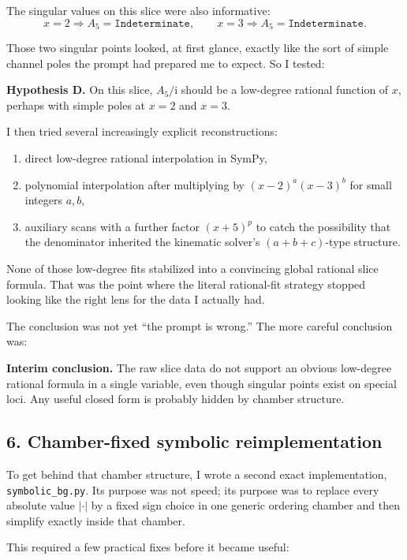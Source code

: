 \documentclass[11pt]{article}
\newcommand{\ii}{\mathrm{i}}
\begin{document}
The singular values on this slice were also informative:
\[
x=2 \Longrightarrow A_5=\texttt{Indeterminate},
\qquad
x=3 \Longrightarrow A_5=\texttt{Indeterminate}.
\]

Those two singular points looked, at first glance, exactly like the sort of
simple channel poles the prompt had prepared me to expect. So I tested:

\medskip
\textbf{Hypothesis D.} On this slice, $A_5/\ii$ should be a low-degree rational
function of $x$, perhaps with simple poles at $x=2$ and $x=3$.
\medskip

I then tried several increasingly explicit reconstructions:

\begin{enumerate}
\item direct low-degree rational interpolation in SymPy,
\item polynomial interpolation after multiplying by $(x-2)^a(x-3)^b$ for small
integers $a,b$,
\item auxiliary scans with a further factor $(x+5)^p$ to catch the possibility
that the denominator inherited the kinematic solver's $(a+b+c)$-type
structure.
\end{enumerate}

None of those low-degree fits stabilized into a convincing global rational
slice formula. That was the point where the literal rational-fit strategy
stopped looking like the right lens for the data I actually had.

The conclusion was not yet ``the prompt is wrong.'' The more careful
conclusion was:

\medskip
\textbf{Interim conclusion.} The raw slice data do not support an obvious
low-degree rational formula in a single variable, even though singular points
exist on special loci. Any useful closed form is probably hidden by chamber
structure.
\medskip

\subsection*{6. Chamber-fixed symbolic reimplementation}

To get behind that chamber structure, I wrote a second exact implementation,
\texttt{symbolic\_bg.py}. Its purpose was not speed; its purpose was to replace
every absolute value $\lvert\cdot\rvert$ by a fixed sign choice in one generic
ordering chamber and then simplify exactly inside that chamber.

This required a few practical fixes before it became useful:
\end{document}
